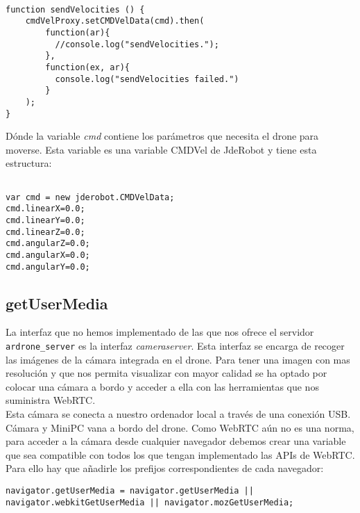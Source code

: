 \begin{lstlisting}[caption=Función manejadora de las órdenes.]

function sendVelocities () {
    cmdVelProxy.setCMDVelData(cmd).then(
        function(ar){
          //console.log("sendVelocities.");
        },
        function(ex, ar){
          console.log("sendVelocities failed.")
        }
    );
}

\end{lstlisting}

Dónde la variable \emph{cmd} contiene los parámetros que necesita el drone para moverse. Esta variable es una variable CMDVel de JdeRobot y tiene esta estructura:\\

\begin{lstlisting}[caption=Variable CMD]

var cmd = new jderobot.CMDVelData; 
cmd.linearX=0.0;
cmd.linearY=0.0;
cmd.linearZ=0.0;
cmd.angularZ=0.0;
cmd.angularX=0.0;
cmd.angularY=0.0;

\end{lstlisting}




\subsection{getUserMedia}

La interfaz que no hemos implementado de las que nos ofrece el servidor \texttt{ardrone\_server} es la interfaz \emph{cameraserver}. Esta interfaz se encarga de recoger las imágenes de la cámara integrada en el drone. Para tener una imagen con mas resolución y que nos permita visualizar con mayor calidad se ha optado por colocar una cámara a bordo y acceder a ella con las herramientas que nos suministra WebRTC.\\

Esta cámara se conecta a nuestro ordenador local a través de una conexión USB. Cámara y MiniPC vana a bordo del drone. Como WebRTC aún no es una norma, para acceder a la cámara desde cualquier navegador debemos crear una variable que sea compatible con todos los que tengan implementado las APIs de WebRTC. Para ello hay que añadirle los prefijos correspondientes de cada navegador:\\


\begin{lstlisting}[caption=Variable de getUserMedia.]
navigator.getUserMedia = navigator.getUserMedia || navigator.webkitGetUserMedia || navigator.mozGetUserMedia;
\end{lstlisting}


